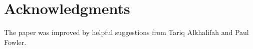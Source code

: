 
\section{Acknowledgments}

The paper was improved by helpful suggestions from Tariq Alkhalifah and Paul
Fowler.





%
%
